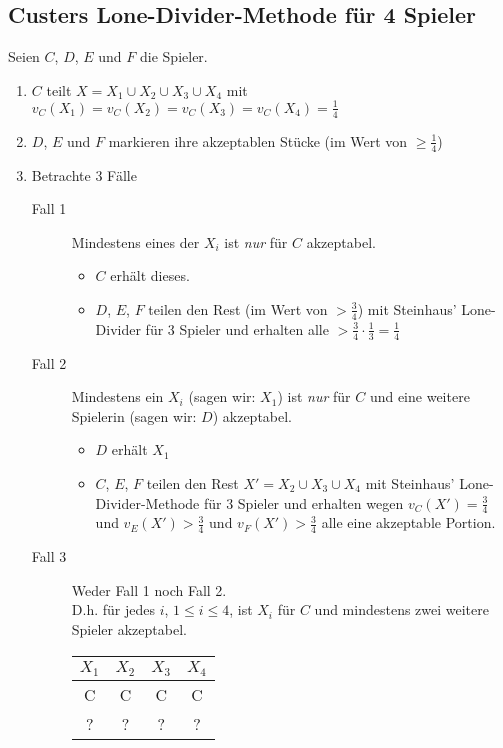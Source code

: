\documentclass[a4paper,10pt]{scrartcl}
\begin{document}
\subsection{Custers Lone-Divider-Methode für 4 Spieler}
Seien $C$, $D$, $E$ und $F$ die Spieler.
\begin{enumerate}
 \item $C$ teilt $X=X_1\cup X_2\cup X_3\cup X_4$ mit $v_C(X_1)=v_C(X_2)=v_C(X_3)=v_C(X_4)=\frac{1}{4}$
 \item $D$, $E$ und $F$ markieren ihre akzeptablen Stücke (im Wert von $\geq\frac{1}{4}$)
 \item Betrachte 3 Fälle
       \begin{description}
        \item[Fall 1] Mindestens eines der $X_i$ ist \emph{nur} für $C$ akzeptabel.
         \begin{itemize}
          \item $C$ erhält dieses.
          \item $D$, $E$, $F$ teilen den Rest (im Wert von $>\frac{3}{4}$) mit Steinhaus' Lone-Divider für 3 Spieler und erhalten alle
                $>\frac{3}{4}\cdot\frac{1}{3}=\frac{1}{4}$
         \end{itemize}
         \item[Fall 2] Mindestens ein $X_i$ (sagen wir: $X_1$) ist \emph{nur} für $C$ und eine weitere Spielerin (sagen wir: $D$) akzeptabel.
          \begin{itemize}
           \item $D$ erhält $X_1$
           \item $C$, $E$, $F$ teilen den Rest $X'=X_2\cup X_3\cup X_4$ mit Steinhaus' Lone-Divider-Methode für 3 Spieler und erhalten wegen 
                 $v_C(X')=\frac{3}{4}$ und $v_E(X')>\frac{3}{4}$ und $v_F(X')>\frac{3}{4}$ alle eine akzeptable Portion.
          \end{itemize}
          \item[Fall 3] Weder Fall 1 noch Fall 2.\\
                        D.h. für jedes $i$, $1\leq i\leq4$, ist $X_i$ für $C$ und mindestens zwei weitere Spieler akzeptabel.\\
                        \begin{tabular}{cccc}
                         $X_1$ & $X_2$ & $X_3$ & $X_4$\\\hline
                         C&C&C&C\\
                         ?&?&?&?\\

\end{tabular}
\end{description}
\end{enumerate}
\end{document}
